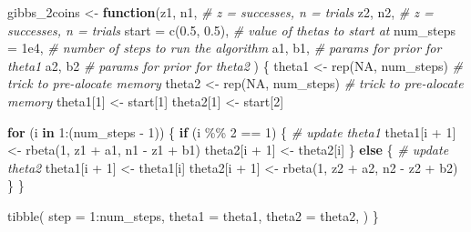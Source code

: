 \documentclass[
  12pt,
]{book}
\newenvironment{Shaded}{\begin{snugshade}}{\end{snugshade}}
\newcommand{\AttributeTok}[1]{\textcolor[rgb]{0.77,0.63,0.00}{#1}}
\newcommand{\CommentTok}[1]{\textcolor[rgb]{0.56,0.35,0.01}{\textit{#1}}}
\newcommand{\ConstantTok}[1]{\textcolor[rgb]{0.00,0.00,0.00}{#1}}
\newcommand{\ControlFlowTok}[1]{\textcolor[rgb]{0.13,0.29,0.53}{\textbf{#1}}}
\newcommand{\DecValTok}[1]{\textcolor[rgb]{0.00,0.00,0.81}{#1}}
\newcommand{\FloatTok}[1]{\textcolor[rgb]{0.00,0.00,0.81}{#1}}
\newcommand{\FunctionTok}[1]{\textcolor[rgb]{0.00,0.00,0.00}{#1}}
\newcommand{\NormalTok}[1]{#1}
\newcommand{\OtherTok}[1]{\textcolor[rgb]{0.56,0.35,0.01}{#1}}
\newcommand{\SpecialCharTok}[1]{\textcolor[rgb]{0.00,0.00,0.00}{#1}}
\theoremstyle{definition}
\theoremstyle{definition}
\theoremstyle{definition}
\theoremstyle{definition}
\theoremstyle{remark}
\begin{document}
\begin{Shaded}
\begin{Highlighting}[]
\NormalTok{gibbs\_2coins }\OtherTok{\textless{}{-}} \ControlFlowTok{function}\NormalTok{(z1, n1, }\CommentTok{\# z = successes, n = trials}
\NormalTok{                         z2, n2, }\CommentTok{\# z = successes, n = trials}
                         \AttributeTok{start =} \FunctionTok{c}\NormalTok{(}\FloatTok{0.5}\NormalTok{, }\FloatTok{0.5}\NormalTok{), }\CommentTok{\# value of thetas to start at}
                         \AttributeTok{num\_steps =} \FloatTok{1e4}\NormalTok{, }\CommentTok{\# number of steps to run the algorithm}
\NormalTok{                         a1, b1, }\CommentTok{\# params for prior for theta1}
\NormalTok{                         a2, b2 }\CommentTok{\# params for prior for theta2}
\NormalTok{) \{}
\NormalTok{  theta1 }\OtherTok{\textless{}{-}} \FunctionTok{rep}\NormalTok{(}\ConstantTok{NA}\NormalTok{, num\_steps) }\CommentTok{\# trick to pre{-}alocate memory}
\NormalTok{  theta2 }\OtherTok{\textless{}{-}} \FunctionTok{rep}\NormalTok{(}\ConstantTok{NA}\NormalTok{, num\_steps) }\CommentTok{\# trick to pre{-}alocate memory}
\NormalTok{  theta1[}\DecValTok{1}\NormalTok{] }\OtherTok{\textless{}{-}}\NormalTok{ start[}\DecValTok{1}\NormalTok{]}
\NormalTok{  theta2[}\DecValTok{1}\NormalTok{] }\OtherTok{\textless{}{-}}\NormalTok{ start[}\DecValTok{2}\NormalTok{]}

  \ControlFlowTok{for}\NormalTok{ (i }\ControlFlowTok{in} \DecValTok{1}\SpecialCharTok{:}\NormalTok{(num\_steps }\SpecialCharTok{{-}} \DecValTok{1}\NormalTok{)) \{}
    \ControlFlowTok{if}\NormalTok{ (i }\SpecialCharTok{\%\%} \DecValTok{2} \SpecialCharTok{==} \DecValTok{1}\NormalTok{) \{ }\CommentTok{\# update theta1}
\NormalTok{      theta1[i }\SpecialCharTok{+} \DecValTok{1}\NormalTok{] }\OtherTok{\textless{}{-}} \FunctionTok{rbeta}\NormalTok{(}\DecValTok{1}\NormalTok{, z1 }\SpecialCharTok{+}\NormalTok{ a1, n1 }\SpecialCharTok{{-}}\NormalTok{ z1 }\SpecialCharTok{+}\NormalTok{ b1)}
\NormalTok{      theta2[i }\SpecialCharTok{+} \DecValTok{1}\NormalTok{] }\OtherTok{\textless{}{-}}\NormalTok{ theta2[i]}
\NormalTok{    \} }\ControlFlowTok{else}\NormalTok{ \{ }\CommentTok{\# update theta2}
\NormalTok{      theta1[i }\SpecialCharTok{+} \DecValTok{1}\NormalTok{] }\OtherTok{\textless{}{-}}\NormalTok{ theta1[i]}
\NormalTok{      theta2[i }\SpecialCharTok{+} \DecValTok{1}\NormalTok{] }\OtherTok{\textless{}{-}} \FunctionTok{rbeta}\NormalTok{(}\DecValTok{1}\NormalTok{, z2 }\SpecialCharTok{+}\NormalTok{ a2, n2 }\SpecialCharTok{{-}}\NormalTok{ z2 }\SpecialCharTok{+}\NormalTok{ b2)}
\NormalTok{    \}}
\NormalTok{  \}}

  \FunctionTok{tibble}\NormalTok{(}
    \AttributeTok{step =} \DecValTok{1}\SpecialCharTok{:}\NormalTok{num\_steps,}
    \AttributeTok{theta1 =}\NormalTok{ theta1,}
    \AttributeTok{theta2 =}\NormalTok{ theta2,}
\NormalTok{  )}
\NormalTok{\}}
\end{Highlighting}
\end{Shaded}
\end{document}
